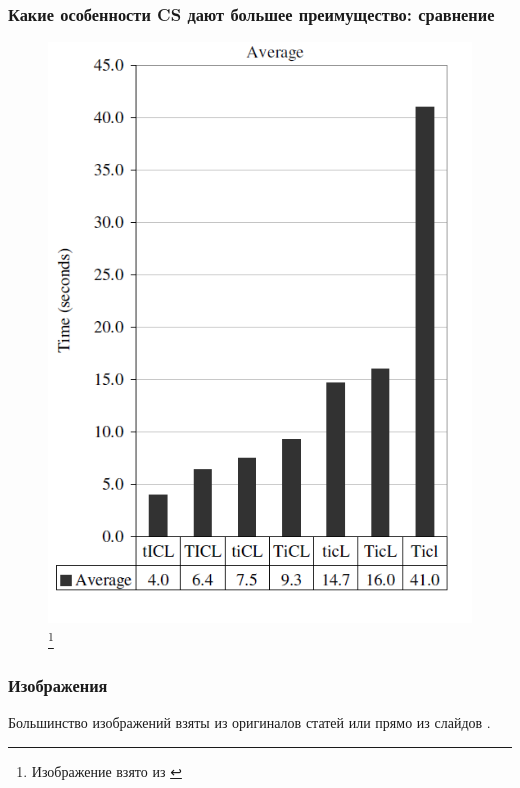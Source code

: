 \documentclass{beamer}
\begin{document}
\begin{frame}
\frametitle{Какие особенности CS дают большее преимущество: сравнение}

\begin{figure}[htb]
\includegraphics[width=\textwidth,height=0.75\textheight,keepaspectratio]{comp-2.png} 
\footnote{\tiny{Изображение взято из \cite{Harizopoulos2009}}}
\end{figure}

\end{frame}


\begin{frame}
\frametitle{Изображения}

Большинство изображений взяты из оригиналов статей или прямо из слайдов \cite{Harizopoulos2009}.

\end{frame}
\end{document}
